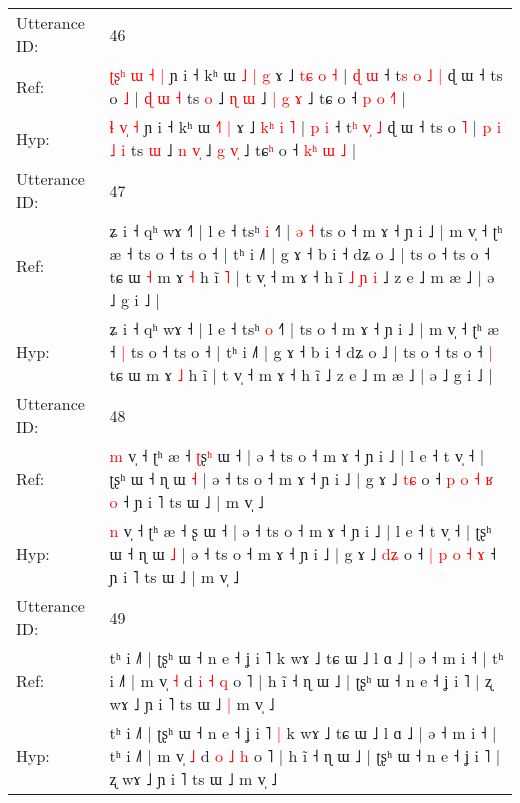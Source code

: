 \documentclass[10pt]{article}
\DeclareRobustCommand{\hl}[1]{{\textcolor{red}{#1}}}
\begin{document}
\begin{longtable}{ll}
 \\
\midrule
Utterance ID: & 46 \\
Ref: & \hl{ʈ}\hl{ʂ}\hl{ʰ} \hl{ɯ}\hl{ }\hl{˧} \hl{|} ɲ i ˧ kʰ ɯ \hl{˩}\hl{ }\hl{|} \hl{g} ɤ ˩ \hl{t}\hl{ɕ} \hl{o} \hl{˧} | \hl{ɖ} \hl{ɯ} ˧ t\hl{s} \hl{o}\hl{ }\hl{˩} \hl{|} ɖ ɯ ˧ ts o \hl{˩} |\hl{}\hl{} \hl{ɖ} \hl{ɯ} \hl{˧} ts \hl{o} ˩ \hl{ɳ} \hl{}\hl{ɯ} ˩ \hl{|} \hl{g}\hl{ }\hl{ɤ} ˩ tɕ\hl{} o ˧ \hl{}\hl{p} \hl{o} \hl{˧}\hl{˥} |
 \\
Hyp: & \hl{}\hl{}\hl{ɬ} \hl{}\hl{v}\hl{̩} \hl{˧} ɲ i ˧ kʰ ɯ \hl{}\hl{˧}\hl{˥} \hl{|} ɤ ˩ \hl{k}\hl{ʰ} \hl{i} \hl{˥} | \hl{p} \hl{i} ˧ t\hl{ʰ} \hl{}\hl{v}\hl{̩} \hl{˩} ɖ ɯ ˧ ts o \hl{˥} |\hl{ }\hl{p} \hl{i} \hl{˩} \hl{i} ts \hl{ɯ} ˩ \hl{n} \hl{v}\hl{̩} ˩ \hl{g} \hl{}\hl{v}\hl{̩} ˩ tɕ\hl{ʰ} o ˧ \hl{k}\hl{ʰ} \hl{ɯ} \hl{}\hl{˩} |
 \\
\midrule
Utterance ID: & 47 \\
Ref: & ʑ i ˧ qʰ wɤ ˧\hl{˥} | l e ˧ tsʰ \hl{i} ˧˥ |\hl{ }\hl{ə}\hl{ }\hl{˧} ts o ˧ m ɤ ˧ ɲ i ˩ | m v̩ ˧ ʈʰ æ ˧\hl{}\hl{} ts o ˧ ts o ˧ | tʰ i ˩˥ | g ɤ ˧ b i ˧ dʑ o ˩ | ts o ˧ ts o ˧\hl{}\hl{} tɕ ɯ\hl{ }\hl{˧} m ɤ \hl{˧} h ĩ\hl{ }\hl{˥} | t v̩ ˧ m ɤ ˧ h ĩ\hl{ }\hl{˩}\hl{ }\hl{ɲ}\hl{ }\hl{i} ˩ z e ˩ m æ ˩ | ə ˩ g i ˩ |
 \\
Hyp: & ʑ i ˧ qʰ wɤ ˧\hl{} | l e ˧ tsʰ \hl{o} ˧˥ |\hl{}\hl{}\hl{}\hl{} ts o ˧ m ɤ ˧ ɲ i ˩ | m v̩ ˧ ʈʰ æ ˧\hl{ }\hl{|} ts o ˧ ts o ˧ | tʰ i ˩˥ | g ɤ ˧ b i ˧ dʑ o ˩ | ts o ˧ ts o ˧\hl{ }\hl{|} tɕ ɯ\hl{}\hl{} m ɤ \hl{˩} h ĩ\hl{}\hl{} | t v̩ ˧ m ɤ ˧ h ĩ\hl{}\hl{}\hl{}\hl{}\hl{}\hl{} ˩ z e ˩ m æ ˩ | ə ˩ g i ˩ |
 \\
\midrule
Utterance ID: & 48 \\
Ref: & \hl{m} v̩ ˧ ʈʰ æ ˧ \hl{ʈ}ʂ\hl{ʰ} ɯ ˧ | ə ˧ ts o ˧ m ɤ ˧ ɲ i ˩ | l e ˧ t v̩ ˧ | ʈʂʰ ɯ ˧ ɳ ɯ \hl{˧} | ə ˧ ts o ˧ m ɤ ˧ ɲ i ˩ | g ɤ ˩ \hl{t}\hl{ɕ} o ˧ \hl{p} \hl{o} \hl{˧} \hl{ʁ} \hl{o} ˧ ɲ i ˥ ts ɯ ˩ | m v̩ ˩
 \\
Hyp: & \hl{n} v̩ ˧ ʈʰ æ ˧ \hl{}ʂ\hl{} ɯ ˧ | ə ˧ ts o ˧ m ɤ ˧ ɲ i ˩ | l e ˧ t v̩ ˧ | ʈʂʰ ɯ ˧ ɳ ɯ \hl{˩} | ə ˧ ts o ˧ m ɤ ˧ ɲ i ˩ | g ɤ ˩ \hl{d}\hl{ʑ} o ˧ \hl{|} \hl{p} \hl{o} \hl{˧} \hl{ɤ} ˧ ɲ i ˥ ts ɯ ˩ | m v̩ ˩
 \\
\midrule
Utterance ID: & 49 \\
Ref: & tʰ i ˩˥ | ʈʂʰ ɯ ˧ n e ˧ ʝ i ˥\hl{}\hl{} k wɤ ˩ tɕ ɯ ˩ l ɑ ˩ | ə ˧ m i ˧ | tʰ i ˩˥ | m v̩ \hl{˧} d \hl{i} \hl{˧} \hl{q} o ˥ | h ĩ ˧ ɳ ɯ ˩ | ʈʂʰ ɯ ˧ n e ˧ ʝ i ˥ | ʐ wɤ ˩ ɲ i ˥ ts ɯ ˩\hl{ }\hl{|} m v̩ ˩
 \\
Hyp: & tʰ i ˩˥ | ʈʂʰ ɯ ˧ n e ˧ ʝ i ˥\hl{ }\hl{|} k wɤ ˩ tɕ ɯ ˩ l ɑ ˩ | ə ˧ m i ˧ | tʰ i ˩˥ | m v̩ \hl{˩} d \hl{o} \hl{˩} \hl{h} o ˥ | h ĩ ˧ ɳ ɯ ˩ | ʈʂʰ ɯ ˧ n e ˧ ʝ i ˥ | ʐ wɤ ˩ ɲ i ˥ ts ɯ ˩\hl{}\hl{} m v̩ ˩

\end{longtable}
\end{document}
